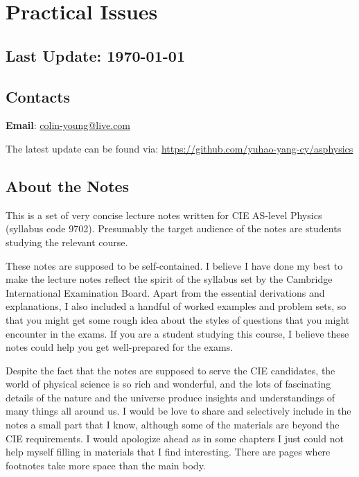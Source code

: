 \section*{Practical Issues}

\subsection*{Last Update: \today}


\subsection*{Contacts}
\textbf{Email}: \url{colin-young@live.com}

The latest update can be found via: \url{https://github.com/yuhao-yang-cy/asphysics}

\subsection*{About the Notes}

This is a set of very concise lecture notes written for CIE AS-level Physics (syllabus code 9702). Presumably the target audience of the notes are students studying the relevant course.

These notes are supposed to be self-contained. I believe I have done my best to make the lecture notes reflect the spirit of the syllabus set by the Cambridge International Examination Board. Apart from the essential derivations and explanations, I also included a handful of worked examples and problem sets, so that you might get some rough idea about the styles of questions that you might encounter in the exams. If you are a student studying this course, I believe these notes could help you get well-prepared for the exams.

Despite the fact that the notes are supposed to serve the CIE candidates, the world of physical science is so rich and wonderful, and the lots of fascinating details of the nature and the universe produce insights and understandings of many things all around us. I would be love to share and selectively include in the notes a small part that I know, although some of the materials are beyond the CIE requirements. I would apologize ahead as in some chapters I just could not help myself filling in materials that I find interesting. There are pages where footnotes take more space than the main body.

